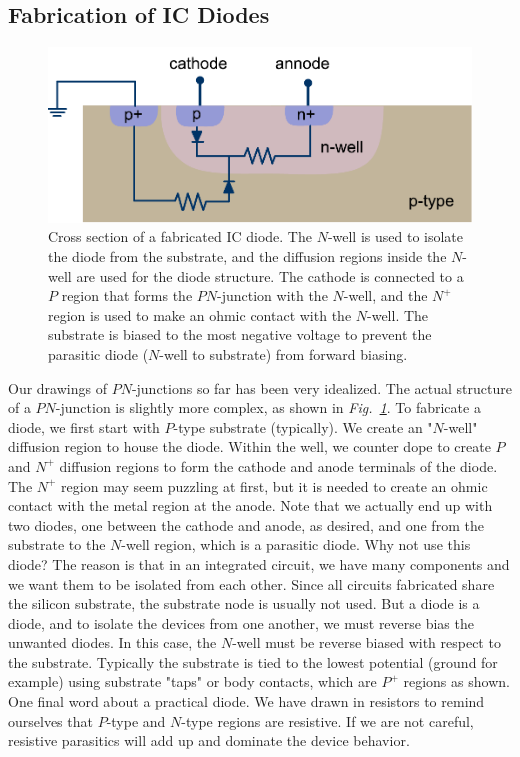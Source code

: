 \subsection{Fabrication of IC Diodes}
\begin{figure}[t]
\centering
\includegraphics[width=.65\columnwidth]{slide44}
\caption{Cross section of a fabricated IC diode.  The $N$-well is used to isolate the diode from the substrate, and the diffusion regions inside the $N$-well are used for the diode structure.  The cathode is connected to a $P$ region that forms the $PN$-junction with the $N$-well, and the $N^+$ region is used to make an ohmic contact with the $N$-well.  The substrate is biased to the most negative voltage to prevent the parasitic diode ($N$-well to substrate) from forward biasing.}
\label{fig:slide44}
\end{figure}
Our drawings of $PN$-junctions so far has been very idealized.  The actual structure of a $PN$-junction is slightly more complex, as shown in \emph{Fig.~\ref{fig:slide44}}.  To fabricate a diode, we first start with $P$-type substrate (typically).  We create an "$N$-well" diffusion region  to house the diode.  Within the well, we counter dope to create $P$ and $N^+$ diffusion regions to form the cathode and anode terminals of the diode.  The $N^+$ region may seem puzzling at first, but it is needed to create an ohmic contact with the metal region at the anode.  Note that we actually end up with two diodes, one between the cathode and anode, as desired, and one from the substrate to the $N$-well region, which is a parasitic diode.  Why not use this diode?  The reason is that in an integrated circuit, we have many components and we want them to be isolated from each other.  Since all circuits fabricated share the silicon substrate, the substrate node is usually not used.  But a diode is a diode, and to isolate the devices from one another, we must reverse bias the unwanted diodes.  In this case, the $N$-well must be reverse biased with respect to the substrate.  Typically the substrate is tied to the lowest potential (ground for example) using substrate "taps" or body contacts, which are $P^+$ regions as shown.  One final word about a practical diode.  We have drawn in resistors to remind ourselves that $P$-type and $N$-type regions are resistive.  If we are not careful, resistive parasitics will add up and dominate the device behavior.  
